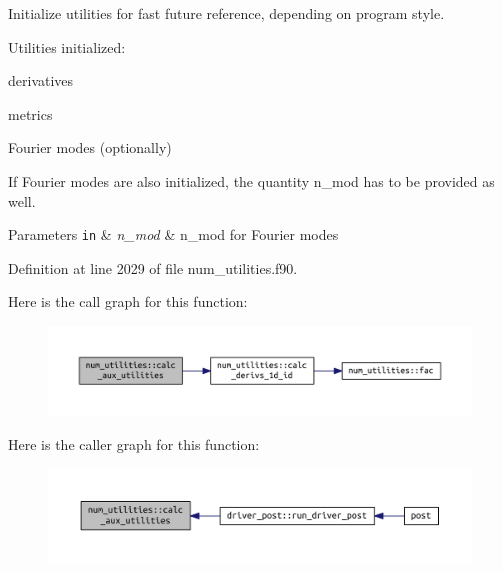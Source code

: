 Initialize utilities for fast future reference, depending on program style. 

Utilities initialized\+:
\begin{DoxyItemize}
\item derivatives
\item metrics
\item Fourier modes (optionally)
\end{DoxyItemize}

If Fourier modes are also initialized, the quantity {\ttfamily n\+\_\+mod} has to be provided as well.


\begin{DoxyParams}[1]{Parameters}
\mbox{\tt in}  & {\em n\+\_\+mod} & n\+\_\+mod for Fourier modes \\
\hline
\end{DoxyParams}


Definition at line 2029 of file num\+\_\+utilities.\+f90.

Here is the call graph for this function\+:
\nopagebreak
\begin{figure}[H]
\begin{center}
\leavevmode
\includegraphics[width=350pt]{namespacenum__utilities_af461ae4c95a7a45da875dcf311e323f5_cgraph}
\end{center}
\end{figure}
Here is the caller graph for this function\+:
\nopagebreak
\begin{figure}[H]
\begin{center}
\leavevmode
\includegraphics[width=350pt]{namespacenum__utilities_af461ae4c95a7a45da875dcf311e323f5_icgraph}
\end{center}
\end{figure}
\mbox{\label{namespacenum__utilities_a4dffe3beba7165dd17cff19a99a9e2ac}} 
